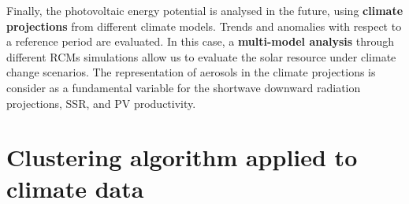   
  Finally, the photovoltaic energy potential is analysed in the future, using \textbf{climate projections} from different climate models. Trends and anomalies with respect to a reference period are evaluated. In this case, a \textbf{multi-model analysis} through different RCMs simulations allow us to evaluate the solar resource under climate change scenarios. The representation of aerosols in the climate projections is consider as a fundamental variable for the shortwave downward radiation projections, SSR, and PV productivity.

  
\section{Clustering algorithm applied to climate data}


